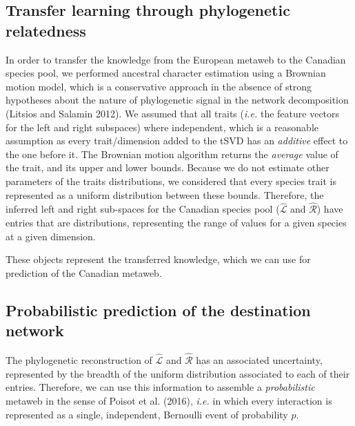 \documentclass[10pt,oneside]{article}
\begin{document}
\hypertarget{transfer-learning-through-phylogenetic-relatedness}{%
\subsection{Transfer learning through phylogenetic
relatedness}\label{transfer-learning-through-phylogenetic-relatedness}}

In order to transfer the knowledge from the European metaweb to the
Canadian species pool, we performed ancestral character estimation using
a Brownian motion model, which is a conservative approach in the absence
of strong hypotheses about the nature of phylogenetic signal in the
network decomposition (Litsios and Salamin 2012). We assumed that all
traits (\emph{i.e.} the feature vectors for the left and right
subspaces) where independent, which is a reasonable assumption as every
trait/dimension added to the tSVD has an \emph{additive} effect to the
one before it. The Brownian motion algorithm returns the \emph{average}
value of the trait, and its upper and lower bounds. Because we do not
estimate other parameters of the traits distributions, we considered
that every species trait is represented as a uniform distribution
between these bounds. Therefore, the inferred left and right sub-spaces
for the Canadian species pool (\(\hat{\mathcal{L}}\) and
\(\hat{\mathcal{R}}\)) have entries that are distributions, representing
the range of values for a given species at a given dimension.

These objects represent the transferred knowledge, which we can use for
prediction of the Canadian metaweb.

\hypertarget{probabilistic-prediction-of-the-destination-network}{%
\subsection{Probabilistic prediction of the destination
network}\label{probabilistic-prediction-of-the-destination-network}}

The phylogenetic reconstruction of \(\hat{\mathcal{L}}\) and
\(\hat{\mathcal{R}}\) has an associated uncertainty, represented by the
breadth of the uniform distribution associated to each of their entries.
Therefore, we can use this information to assemble a
\emph{probabilistic} metaweb in the sense of Poisot et al. (2016),
\emph{i.e.} in which every interaction is represented as a single,
independent, Bernoulli event of probability \(p\).
\end{document}
